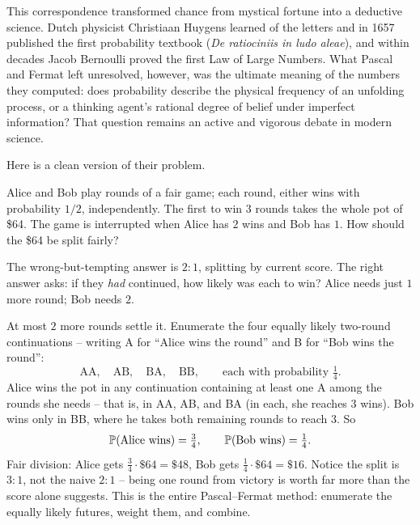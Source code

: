 \begin{historybox}
This correspondence transformed chance from mystical fortune into a deductive
science. Dutch physicist Christiaan Huygens learned of the letters and in 1657
published the first probability textbook (\emph{De ratiociniis in ludo aleae}),
and within decades Jacob Bernoulli proved the first Law of Large Numbers. What
Pascal and Fermat left unresolved, however, was the ultimate meaning of the
numbers they computed: does probability describe the physical frequency of an
unfolding process, or a thinking agent's rational degree of belief under
imperfect information? That question remains an active and vigorous debate in
modern science.
\end{historybox}

Here is a clean version of their problem.

\begin{example}
\label{ch01:ex-points}
Alice and Bob play rounds of a fair game; each round, either wins with probability
$1/2$, independently. The first to win $3$ rounds takes the whole pot of \$64.
The game is interrupted when Alice has $2$ wins and Bob has $1$. How should the
\$64 be split fairly?

The wrong-but-tempting answer is $2{:}1$, splitting by current score. The right
answer asks: if they \emph{had} continued, how likely was each to win? Alice needs
just $1$ more round; Bob needs $2$.

At most $2$ more rounds settle it. Enumerate the four equally likely two-round
continuations -- writing A for ``Alice wins the round'' and B for ``Bob wins the
round'':
\[
  \text{AA},\quad \text{AB},\quad \text{BA},\quad \text{BB},
  \qquad \text{each with probability } \tfrac14.
\]
Alice wins the pot in any continuation containing at least one A among the rounds
she needs -- that is, in AA, AB, and BA (in each, she reaches $3$ wins). Bob wins
only in BB, where he takes both remaining rounds to reach $3$. So
\[
  \P(\text{Alice wins}) = \tfrac34, \qquad \P(\text{Bob wins}) = \tfrac14.
\]
Fair division: Alice gets $\frac34 \cdot \$64 = \$48$, Bob gets
$\frac14 \cdot \$64 = \$16$. Notice the split is $3{:}1$, not the naive $2{:}1$ --
being one round from victory is worth far more than the score alone suggests. This
is the entire Pascal--Fermat method: enumerate the equally likely futures, weight
them, and combine.
\end{example}

